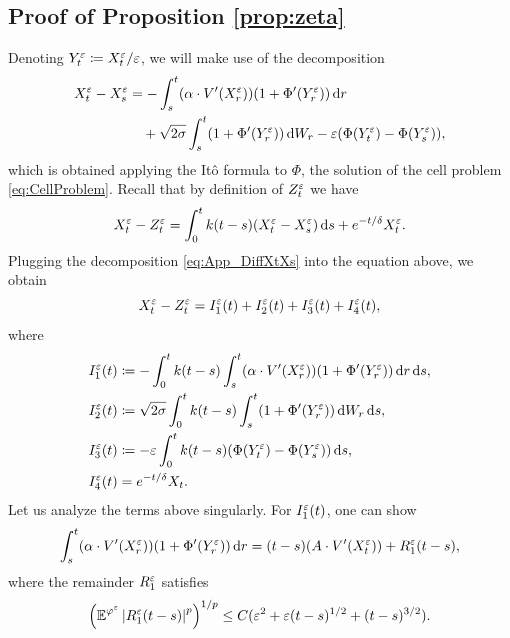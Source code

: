 \documentclass[10pt]{article}
\begin{document}
\begin{appendices}
\subsection{Proof of Proposition \ref{prop:zeta}}
Denoting $Y_t^\varepsilon \coloneqq X_t^\varepsilon/\varepsilon$, we will make use of the decomposition
\cite[Formula 5.8]{PaS07}
\begin{equation}\label{eq:App_DiffXtXs}
\begin{aligned}
X_t^\varepsilon - X_s^\varepsilon &= -\int_s^t (\alpha \cdot V'(X_r^\varepsilon))(1 + \Phi'(Y^\varepsilon_r)) \,\mathrm{d} r\\
&\quad +\sqrt{2\sigma} \int_s^t (1 + \Phi'(Y_r^\varepsilon)) \,\mathrm{d} W_r - \varepsilon(\Phi(Y^\varepsilon_t)-\Phi(Y^\varepsilon_s)),
\end{aligned}
\end{equation}
which is obtained applying the Itô formula to $\Phi$, the solution of the cell problem \eqref{eq:CellProblem}. Recall that by definition of $Z_t^\varepsilon$ we have
	\begin{equation}
	X_t^\varepsilon - Z_t^\varepsilon = \int_0^t k(t-s) (X_t^\varepsilon - X_s^\varepsilon) \,\mathrm{d} s + e^{-t/\delta}X_t^\varepsilon.
	\end{equation}
	Plugging the decomposition \eqref{eq:App_DiffXtXs} into the equation above, we obtain
	\begin{equation}
	X_t^\varepsilon - Z_t^\varepsilon = I_1^\varepsilon(t) + I_2^\varepsilon(t) + I_3^\varepsilon(t) + I_4^\varepsilon(t),
	\end{equation}
	where
	\begin{equation}
	\begin{aligned}
	I_1^\varepsilon(t) &\coloneqq -\int_0^t k(t-s)\int_s^t (\alpha \cdot V'(X_r^\varepsilon))(1 + \Phi'(Y^\varepsilon_r)) \,\mathrm{d} r \,\mathrm{d} s,\\
	I_2^\varepsilon(t) &\coloneqq \sqrt{2\sigma}\int_0^t k(t-s) \int_s^t (1 + \Phi'(Y_r^\varepsilon)) \,\mathrm{d} W_r \,\mathrm{d} s, \\
	I_3^\varepsilon(t) &\coloneqq - \varepsilon \int_0^t k(t-s)(\Phi(Y^\varepsilon_t)-\Phi(Y^\varepsilon_s)) \,\mathrm{d} s,\\
	I_4^\varepsilon(t) &= e^{-t / \delta}X_t.
	\end{aligned}
	\end{equation}
	Let us analyze the terms above singularly. For $I_1^\varepsilon(t)$, one can show \cite[Proposition 5.8]{PaS07}
	\begin{equation}
	\int_s^t (\alpha \cdot V'(X_r^\varepsilon)) (1 + \Phi'(Y^\varepsilon_r)) \,\mathrm{d} r = (t - s)(A \cdot V'(X_t^\varepsilon)) + R_1^\varepsilon(t-s),
	\end{equation}
	where the remainder $R_1^\varepsilon$ satisfies 
	\begin{equation}\label{eq:FirstTermPavStu}
	\left(\E^{\phi^\epl}\abs{R_1^\epl(t-s)}^p\right)^{1/p} \leq C(\epl^2 + \epl(t-s)^{1/2}+(t-s)^{3/2}).

\end{equation}
\end{appendices}
\end{document}
